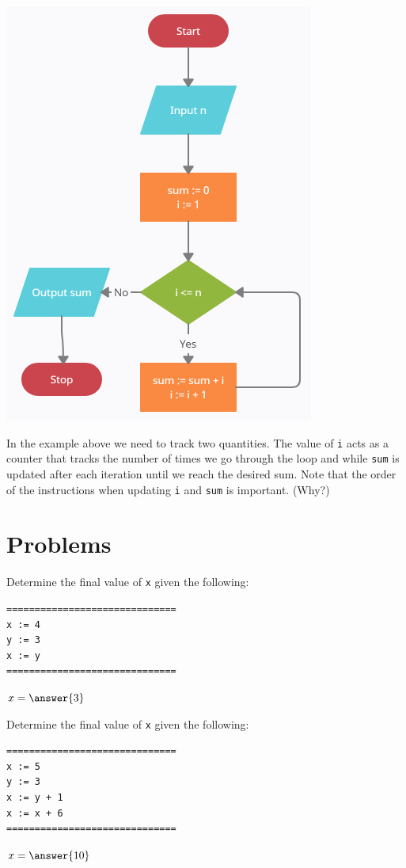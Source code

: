 \documentclass{ximera}
\begin{document}
\begin{center}
	\includegraphics{gausssum.png}
\end{center}

In the example above we need to track two quantities. The value of \verb|i| acts as a counter that tracks the number of times we go through the loop and while \verb|sum| is updated after each iteration until we reach the desired sum. Note that the order of the instructions when updating \verb|i| and \verb|sum| is important. (Why?) 

\section{Problems}

\begin{question}
	Determine the final value of \verb|x| given the following:
	\begin{verbatim}
==============================
x := 4
y := 3
x := y
==============================
	\end{verbatim}
	$x = \answer{3}$
\end{question}

\begin{question}
	Determine the final value of \verb|x| given the following:
	\begin{verbatim}
==============================
x := 5
y := 3
x := y + 1
x := x + 6
==============================
	\end{verbatim}   
	$x = \answer{10}$
\end{question}
\end{document}
